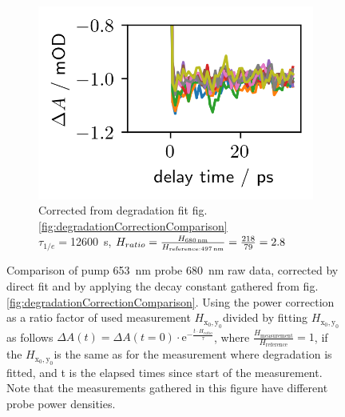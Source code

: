 \documentclass[twoside,openright,listof=numbered]{scrreprt}
\def\radiantExp{\ensuremath{H_\mathrm{x_0,y_0}}}
\begin{document}
\begin{figure}[hbtp]
\begin{subfigure}[t]{0.3215\linewidth}
\includegraphics[width=\columnwidth]{images/PowerVarHigh_CorrEstimate12600_2.8.png} 
\caption{Corrected from degradation fit fig. \ref{fig:degradationCorrectionComparison}\\
$\tau_{1/e}=$\SI{12600}{\second}, $H_{ratio}=\frac{H_\text{\SI{680}{\nano\meter}}}{H_\text{reference:\SI{497}{\nano\meter}}} = \frac{218}{79}= 2.8$}
\end{subfigure}
\caption[Comparison of pump \SI{653}{\nano\meter} probe \SI{680}{\nano\meter} raw data, degradation corrected by directly fitted and adapted, power corrected, decay constant.]{Comparison of pump \SI{653}{\nano\meter} probe \SI{680}{\nano\meter} raw data, corrected by direct fit and by applying the decay constant gathered from fig. \ref{fig:degradationCorrectionComparison}. Using the power correction as a ratio factor of used measurement \radiantExp divided by fitting \radiantExp as follows $\Delta A(t) = \Delta A(t=0)\cdot \mathrm{e}^{-\frac{t\cdot H_{ratio}}{\tau}}$, where $\frac{H_\mathrm{measurement}}{H_\mathrm{reference}} =1$, if the \radiantExp is the same as for the measurement where degradation is fitted, and t is the elapsed times since start of the measurement. Note that the measurements gathered in this figure have different probe power densities.\label{fig:powerVarCorrection}}
\end{figure}
\end{document}
